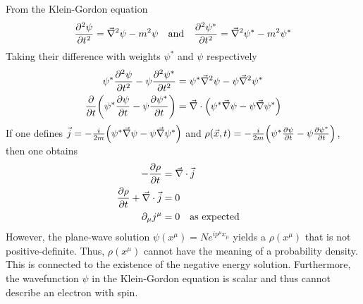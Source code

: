 \documentclass[12pt,a4paper,titlepage]{article}
\newcommand{\pd}[1]{\partial_{#1}} %
\begin{document}
From the Klein-Gordon equation
\begin{equation}
\pdv[2]{\psi}{t}=\vec{\nabla}^{2}\psi-m^{2}\psi\qq{and}\pdv[2]{\psi^{*}}{t}=\vec{\nabla}^{2}\psi^{*}-m^{2}\psi^{*}
\end{equation}
Taking their difference with weights $\psi^{*}$ and $\psi$ respectively
\begin{equation}
\begin{aligned}
\psi^{*}\pdv[2]{\psi}{t}-\psi\pdv[2]{\psi^{*}}{t}&=\psi^{*}\vec{\nabla}^{2}\psi-\psi\vec{\nabla}^{2}\psi^{*}\\
\pdv{t}\qty(\psi^{*}\pdv{\psi}{t}-\psi\pdv{\psi^{*}}{t})&=\vec{\nabla}\cdot\qty(\psi^{*}\vec{\nabla}\psi-\psi\vec{\nabla}\psi^{*})
\end{aligned}
\end{equation}
If one defines $\vec{j}=-\frac{i}{2m}\qty(\psi^{*}\vec{\nabla}\psi-\psi\vec{\nabla}\psi^{*})$ and $\rho(\vec{x},t)=-\frac{i}{2m}\qty(\psi^{*}\pdv{\psi}{t}-\psi\pdv{\psi^{*}}{t})$, then one obtains
\begin{equation}
\begin{aligned}
-\pdv{\rho}{t}&=\vec{\nabla}\cdot\vec{j}\\
\pdv{\rho}{t}+\vec{\nabla}\cdot\vec{j}&=0\\
\pd{\mu}j^{\mu}&=0\qq{as expected}
\end{aligned}
\end{equation}
However, the plane-wave solution $\psi(x^{\mu})=Ne^{ip^{\mu}x_{\mu}}$ yields a $\rho(x^{\mu})$ that is not positive-definite. Thus, $\rho(x^{\mu})$ cannot have the meaning of a probability density. This is connected to the existence of the negative energy solution. Furthermore, the wavefunction $\psi$ in the Klein-Gordon equation is scalar and thus cannot describe an electron with spin.
\end{document}
